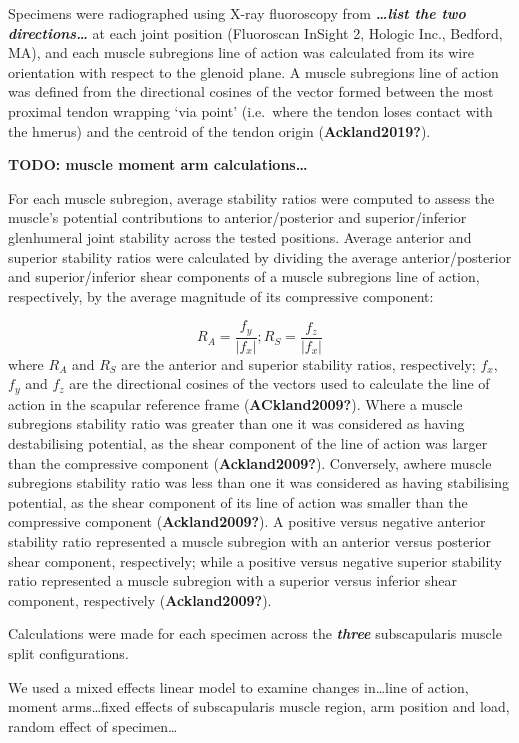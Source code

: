 \documentclass[]{elsarticle} %
\begin{document}
Specimens were radiographed using X-ray fluoroscopy from
\textbf{\emph{\ldots list the two directions\ldots{}}} at each joint
position (Fluoroscan InSight 2, Hologic Inc., Bedford, MA), and each
muscle subregions line of action was calculated from its wire
orientation with respect to the glenoid plane. A muscle subregions line
of action was defined from the directional cosines of the vector formed
between the most proximal tendon wrapping `via point' (i.e.~where the
tendon loses contact with the hmerus) and the centroid of the tendon
origin (\textbf{Ackland2019?}).

\textbf{TODO: muscle moment arm calculations\ldots{}}

For each muscle subregion, average stability ratios were computed to
assess the muscle's potential contributions to anterior/posterior and
superior/inferior glenhumeral joint stability across the tested
positions. Average anterior and superior stability ratios were
calculated by dividing the average anterior/posterior and
superior/inferior shear components of a muscle subregions line of
action, respectively, by the average magnitude of its compressive
component:

\[R_{A} = \frac{f_{y}}{|f_{x}|}; R_{S} = \frac{f_{z}}{|f_{x}|}\] where
\(R_{A}\) and \(R_{S}\) are the anterior and superior stability ratios,
respectively; \(f_{x}\), \(f_{y}\) and \(f_{z}\) are the directional
cosines of the vectors used to calculate the line of action in the
scapular reference frame (\textbf{ACkland2009?}). Where a muscle
subregions stability ratio was greater than one it was considered as
having destabilising potential, as the shear component of the line of
action was larger than the compressive component
(\textbf{Ackland2009?}). Conversely, awhere muscle subregions stability
ratio was less than one it was considered as having stabilising
potential, as the shear component of its line of action was smaller than
the compressive component (\textbf{Ackland2009?}). A positive versus
negative anterior stability ratio represented a muscle subregion with an
anterior versus posterior shear component, respectively; while a
positive versus negative superior stability ratio represented a muscle
subregion with a superior versus inferior shear component, respectively
(\textbf{Ackland2009?}).

Calculations were made for each specimen across the
\textbf{\emph{three}} subscapularis muscle split configurations.

We used a mixed effects linear model to examine changes in\ldots line of
action, moment arms\ldots fixed effects of subscapularis muscle region,
arm position and load, random effect of specimen\ldots{}
\end{document}
